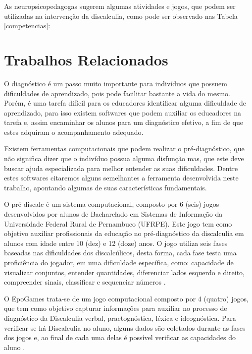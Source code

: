 \documentclass[
	12pt,				%
    oneside,			%
	a4paper,			%
	english,			%
	french,				%
	spanish,			%
	brazil,				%
	]{abntex2}
\begin{document}
As neuropsicopedagogas  sugerem algumas atividades e jogos, que podem ser utilizadas na intervenção da discalculia, como pode ser observado nas Tabela \ref{competencias}:


\chapter{Trabalhos Relacionados}

O diagnóstico é um passo muito importante para indivíduos que possuem dificuldades de aprendizado, pois pode facilitar bastante a vida do mesmo. Porém, é uma tarefa difícil para os educadores identificar alguma dificuldade de aprendizado, para isso existem softwares que podem auxiliar os educadores na tarefa e, assim encaminhar os alunos para um diagnóstico efetivo, a fim de que estes adquiram o acompanhamento adequado.

Existem ferramentas computacionais que podem realizar o pré-diagnóstico, que não significa dizer que o indivíduo possua alguma disfunção mas, que este deve buscar ajuda especializada para melhor entender as suas dificuldades. Dentre estes softwares citaremos alguns semelhantes a ferramenta desenvolvida neste trabalho, apontando algumas de suas características fundamentais.

O pré-discalc é um sistema computacional, composto por 6 (seis) jogos desenvolvidos por alunos de Bacharelado em Sistemas de Informação da Universidade Federal Rural de Pernambuco (UFRPE). Este jogo tem como objetivo auxiliar profissionais da educação no pré-diagnóstico da discalculia em alunos com idade entre 10 (dez) e 12 (doze) anos. O jogo utiliza seis fases baseadas nas dificuldades dos discalcúlicos, desta forma, cada fase testa uma proficiência do jogador, em uma dificuldade específica, como: capacidade de visualizar conjuntos, entender quantidades, diferenciar lados esquerdo e direito, compreender sinais, classificar e sequenciar números \cite{Andrade}.

O EpoGames trata-se de um jogo computacional composto por 4 (quatro) jogos, que tem como objetivo capturar informações para auxiliar no processo de diagnóstico da Discalculia verbal, practognóstica, léxica e ideognóstica. Para verificar se há Discalculia no aluno, alguns dados são coletados durante as fases dos jogos e, ao final de cada uma delas é possível verificar as capacidades do aluno \cite{Medeiros}.
\end{document}
